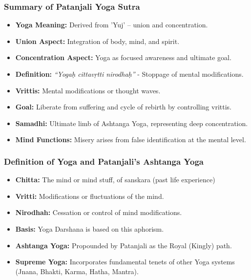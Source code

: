 \begin{frame}[fragile]\frametitle{Summary of Patanjali Yoga Sutra}

    \begin{itemize}
        \item \textbf{Yoga Meaning:} Derived from 'Yuj' – union and concentration.
        \item \textbf{Union Aspect:} Integration of body, mind, and spirit.
        \item \textbf{Concentration Aspect:} Yoga as focused awareness and ultimate goal.
        \item \textbf{Definition:} \textit{“Yogaḥ cittavṛtti nirodhaḥ”} - Stoppage of mental modifications.
        \item \textbf{Vrittis:} Mental modifications or thought waves.
        \item \textbf{Goal:} Liberate from suffering and cycle of rebirth by controlling vrittis.
        \item \textbf{Samadhi:} Ultimate limb of Ashtanga Yoga, representing deep concentration.
        \item \textbf{Mind Functions:} Misery arises from false identification at the mental level.
    \end{itemize}

\end{frame}

\begin{frame}[fragile]\frametitle{Definition of Yoga and Patanjali's Ashtanga Yoga}

    \begin{itemize}
        \item \textbf{Chitta:} The mind or mind stuff, of sanskara (past life experience)
        \item \textbf{Vritti:} Modifications or fluctuations of the mind.
        \item \textbf{Nirodhah:} Cessation or control of mind modifications.
        \item \textbf{Basis:} Yoga Darshana is based on this aphorism.
        \item \textbf{Ashtanga Yoga:} Propounded by Patanjali as the Royal (Kingly) path.
        \item \textbf{Supreme Yoga:} Incorporates fundamental tenets of other Yoga systems (Jnana, Bhakti, Karma, Hatha, Mantra).
    \end{itemize}

\end{frame}


